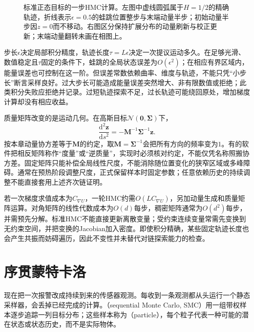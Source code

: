 \begin{figure}[htbp]
  \centering
  
  \caption{标准正态目标的一步HMC计算。左图中虚线圆弧属于$H=1/2$的精确轨迹，折线表示$\epsilon=0.5$的蛙跳位置整步与末端动量半步；初始动量半步因$z=0$而不移动。右图区分保持扩展分布的动量刷新与校正更新；末端动量翻转未画在相图上。}
  \label{fig:pgm-sampling-hmc}
\end{figure}

步长$\epsilon$决定局部积分精度，轨迹长度$\tau=L\epsilon$决定一次提议运动多久。在足够光滑、数值稳定且$\tau$固定的条件下，蛙跳的全局状态误差为$O(\epsilon^2)$；在相应有界区域内，能量误差也可控制在这一阶。但误差常数依赖曲率、维度与轨迹，不能只凭“小步长”断言采样良好。过大步长可能造成能量误差突然增大、非有限数值或拒绝；此类积分失败应拒绝并记录。过短轨迹探索不足，过长轨迹可能绕回原处，增加梯度计算却没有相应收益。

质量矩阵改变的是运动几何。在高斯目标$\mathcal{N}(\bm{0},\bm{\Sigma})$下，
\[
  \frac{\mathrm{d}^2\bm{z}}{\mathrm{d}s^2}
     =-\bm{M}^{-1}\bm{\Sigma}^{-1}\bm{z}.
\]
按本章动量协方差等于$\bm{M}$的约定，取$\bm{M}=\bm{\Sigma}^{-1}$会把所有方向的频率变为$1$。有的软件把相反矩阵称作“度量”或“逆质量”，实现时必须核对约定，不能仅凭名称照搬协方差。固定矩阵只能补偿全局线性尺度，不能消除随位置变化的狭窄区域或多峰障碍。通常在预热阶段调整尺度，正式保留样本时固定参数；任意依赖历史的持续调整不能直接套用上述齐次链证明。

若一次梯度求值成本为$C_{\nabla U}$，一轮HMC约需$O(L C_{\nabla U})$，另加动量生成和质量矩阵运算。对角矩阵的线性代数成本为$O(d)$每步，稠密矩阵通常为$O(d^2)$每步，并需预先分解。标准HMC不能直接更新离散变量；受约束连续变量常需先变换到无约束空间，并把变换的Jacobian加入密度。即使积分精确，某些固定轨迹长度也会产生共振而妨碍遍历，因此不变性并未替代对链探索能力的检查。

\section{序贯蒙特卡洛}
\label{sec:pgm-sampling-smc}

现在把一次报警改成持续到来的传感器观测。每收到一条观测都从头运行一个静态采样器，会丢掉已经完成的计算。（sequential Monte Carlo, SMC）用一组带权样本逐步追踪一列目标分布；这些样本称为（particle），每个粒子代表一种可能的潜在状态或状态历史，而不是实际物体。

